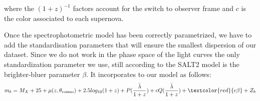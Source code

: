 \documentclass[\docopts]{\docclass}
\begin{document}
where the $(1+z)^{-1}$ factors account for the switch to observer frame and $c$ is the color associated to each supernova.


Once the spectrophotometric model has been correctly parametrized, we have to add the standardisation parameters that will ensure the smallest dispersion of our dataset.
Since we do not work in the phase space of the light curves the only standardization parameter we use, still according to the SALT2 model is the brighter-bluer parameter $\beta$.
It incorporates to our model as follows:
\begin{equation}
\label{eq::model}
m_b = M_X + 25 + \mu(z, \theta_\text{cosmo}) + 2.5log_{10}(1+z) + P(\frac{\bar \lambda}{1+z}) + cQ(\frac{\bar \lambda}{1+z}) + \textcolor{red}{c\beta}+ \mathcal{Z}_b
\end{equation}

\end{document}

